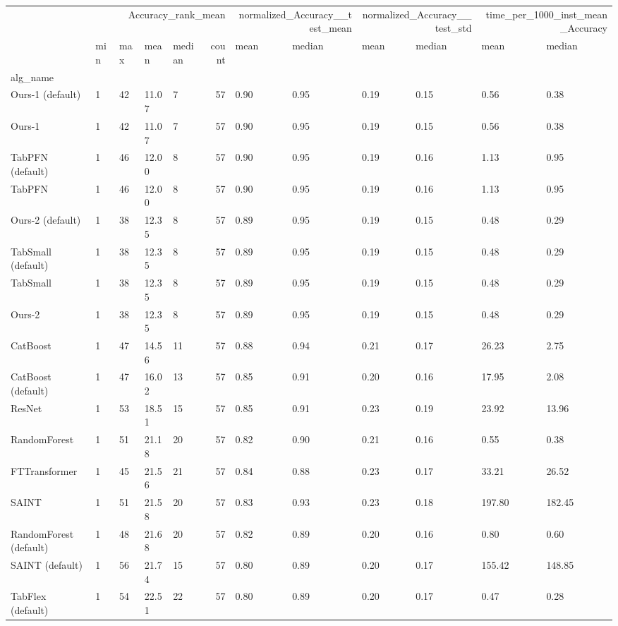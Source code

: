 \begin{tabular}{lllllrllllll}
\toprule
 & \multicolumn{5}{r}{Accuracy_rank_mean} & \multicolumn{2}{r}{normalized_Accuracy__test_mean} & \multicolumn{2}{r}{normalized_Accuracy__test_std} & \multicolumn{2}{r}{time_per_1000_inst_mean_Accuracy} \\
 & min & max & mean & median & count & mean & median & mean & median & mean & median \\
alg_name &  &  &  &  &  &  &  &  &  &  &  \\
\midrule
Ours-1 (default) & 1 & 42 & 11.07 & 7 & 57 & 0.90 & 0.95 & 0.19 & 0.15 & 0.56 & 0.38 \\
Ours-1 & 1 & 42 & 11.07 & 7 & 57 & 0.90 & 0.95 & 0.19 & 0.15 & 0.56 & 0.38 \\
TabPFN (default) & 1 & 46 & 12.00 & 8 & 57 & 0.90 & 0.95 & 0.19 & 0.16 & 1.13 & 0.95 \\
TabPFN & 1 & 46 & 12.00 & 8 & 57 & 0.90 & 0.95 & 0.19 & 0.16 & 1.13 & 0.95 \\
Ours-2 (default) & 1 & 38 & 12.35 & 8 & 57 & 0.89 & 0.95 & 0.19 & 0.15 & 0.48 & 0.29 \\
TabSmall (default) & 1 & 38 & 12.35 & 8 & 57 & 0.89 & 0.95 & 0.19 & 0.15 & 0.48 & 0.29 \\
TabSmall & 1 & 38 & 12.35 & 8 & 57 & 0.89 & 0.95 & 0.19 & 0.15 & 0.48 & 0.29 \\
Ours-2 & 1 & 38 & 12.35 & 8 & 57 & 0.89 & 0.95 & 0.19 & 0.15 & 0.48 & 0.29 \\
CatBoost & 1 & 47 & 14.56 & 11 & 57 & 0.88 & 0.94 & 0.21 & 0.17 & 26.23 & 2.75 \\
CatBoost (default) & 1 & 47 & 16.02 & 13 & 57 & 0.85 & 0.91 & 0.20 & 0.16 & 17.95 & 2.08 \\
ResNet & 1 & 53 & 18.51 & 15 & 57 & 0.85 & 0.91 & 0.23 & 0.19 & 23.92 & 13.96 \\
RandomForest & 1 & 51 & 21.18 & 20 & 57 & 0.82 & 0.90 & 0.21 & 0.16 & 0.55 & 0.38 \\
FTTransformer & 1 & 45 & 21.56 & 21 & 57 & 0.84 & 0.88 & 0.23 & 0.17 & 33.21 & 26.52 \\
SAINT & 1 & 51 & 21.58 & 20 & 57 & 0.83 & 0.93 & 0.23 & 0.18 & 197.80 & 182.45 \\
RandomForest (default) & 1 & 48 & 21.68 & 20 & 57 & 0.82 & 0.89 & 0.20 & 0.16 & 0.80 & 0.60 \\
SAINT (default) & 1 & 56 & 21.74 & 15 & 57 & 0.80 & 0.89 & 0.20 & 0.17 & 155.42 & 148.85 \\
TabFlex (default) & 1 & 54 & 22.51 & 22 & 57 & 0.80 & 0.89 & 0.20 & 0.17 & 0.47 & 0.28 \\

\end{tabular}
